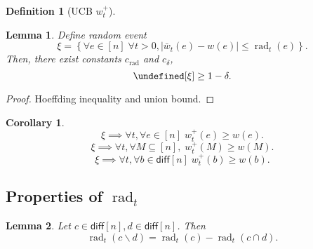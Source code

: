 \documentclass{article}
\newcommand{\junk}[1]{}
\newtheorem{define}{Definition}
\newtheorem{lemma}{Lemma}
\newtheorem{corollary}{Corollary}
\newcommand{\diff}{\mathsf{diff}}
\newcommand{\del}{\backslash}
\DeclareMathOperator{\rad}{rad}
\let\Pr\undefined
\DeclareMathOperator{\Pr}{Pr}
\begin{document}
\begin{spacing}{1.1}
\begin{define}[UCB $w_t^+$]
\end{define}

\begin{lemma}
\label{lemma:conf}
Define random event 
$$
\xi = \left\{\forall e\in[n]\; \forall t>0, |\bar w_t(e)-w(e)|\le \rad_t(e) \right\}.
$$
Then, there exist constants $c_{\rad}$ and $c_\delta$,
$$
\Pr[\xi] \ge 1-\delta.
$$
\end{lemma}
\begin{proof}
Hoeffding inequality and union bound.
\end{proof}



\begin{corollary}
\label{corr:conf}
$$
\xi \implies \forall t,\forall e\in[n] \; w_t^+(e) \ge w(e).
$$
$$
\xi \implies \forall t,\forall M\subseteq[n],\; w_t^+(M) \ge w(M).
$$
$$
\xi \implies \forall t,\forall b\in\diff[n]\; w_t^+(b) \ge w(b).
$$
\end{corollary}

\junk{
\begin{lemma}
Let $c\in \diff[n],d\in \diff[n]$. Let $\rad_t$ be a radius function.
Then,
\begin{equation}
\rad_t(c\cup d) = \rad_t(c)+\rad_t(d)-\rad_t(c\cap d).
\end{equation}
\end{lemma}

\begin{proof}
Let $c=(c_+,c_-)$ and $d=(d_+,d_-)$.
We have
\begin{align}
\rad_t(c\cup d) &= \rad_t(c_+\cup d_+) + \rad_t(c_-\cup d_-)\\
			  &= \rad_t(c_+)+\rad_t(d_+)-\rad_t(c_+\cap d_+)
			    +\rad_t(c_-)+\rad_t(d_-)-\rad_t(c_-\cap d_-)\\
			  &= \rad_t(c)+\rad_t(d)-\rad_t(c\cap d).
\end{align}
\end{proof}
}

\subsection{Properties of $\rad_t$}

\begin{lemma}
\label{lemma:rad-diff-simple}
Let $c\in \diff[n],d\in \diff[n]$.
Then
\begin{equation}
\rad_t(c\del d) = \rad_t(c)-\rad_t(c\cap d).
\end{equation}
\end{lemma}


\end{spacing}
\end{document}
